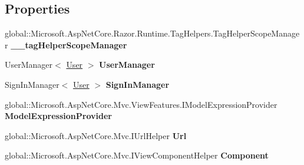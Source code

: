\subsection*{Properties}
\begin{DoxyCompactItemize}
\item 
\mbox{\label{class_asp_net_core_1_1_views___home___index_a49424f2b10bda08aa935cff97b43ee46}} 
global\+::\+Microsoft.\+Asp\+Net\+Core.\+Razor.\+Runtime.\+Tag\+Helpers.\+Tag\+Helper\+Scope\+Manager {\bfseries \+\_\+\+\_\+tag\+Helper\+Scope\+Manager}
\item 
User\+Manager$<$ \mbox{\hyperlink{class_projeto_e_s_w_1_1_models_1_1_user}{User}} $>$ {\bfseries User\+Manager}
\item 
\mbox{\label{class_asp_net_core_1_1_views___home___index_a24c7a21889829c04376211aa8190df17}} 
Sign\+In\+Manager$<$ \mbox{\hyperlink{class_projeto_e_s_w_1_1_models_1_1_user}{User}} $>$ {\bfseries Sign\+In\+Manager}
\item 
\mbox{\label{class_asp_net_core_1_1_views___home___index_a353c3492494e5b272a04a91ccb0b8c19}} 
global\+::\+Microsoft.\+Asp\+Net\+Core.\+Mvc.\+View\+Features.\+I\+Model\+Expression\+Provider {\bfseries Model\+Expression\+Provider}
\item 
\mbox{\label{class_asp_net_core_1_1_views___home___index_ad37ff5e71a1829f15f99f907c0ae1afc}} 
global\+::\+Microsoft.\+Asp\+Net\+Core.\+Mvc.\+I\+Url\+Helper {\bfseries Url}
\item 
\mbox{\label{class_asp_net_core_1_1_views___home___index_a620da9aa088862485f0666c8f85353c0}} 
global\+::\+Microsoft.\+Asp\+Net\+Core.\+Mvc.\+I\+View\+Component\+Helper {\bfseries Component}

\end{DoxyCompactItemize}
